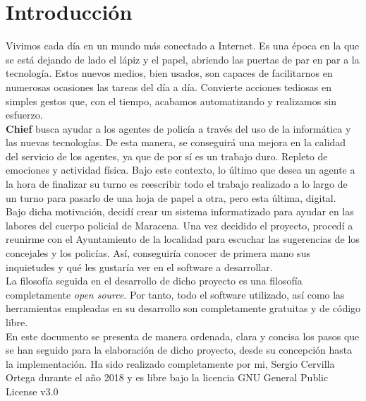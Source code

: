 \chapter{Introducción}

Vivimos cada día en un mundo más conectado a Internet. Es una época en la que se está dejando de 
lado el lápiz y el papel, abriendo las puertas de par en par a la tecnología. Estos nuevos medios, bien
usados, son capaces de facilitarnos en numerosas ocasiones las tareas del día a día. Convierte acciones
tediosas en simples gestos que, con el tiempo, acabamos automatizando y realizamos sin esfuerzo.\\ 

\textbf{Chief} busca ayudar a los agentes de policía a través del uso de la informática y las nuevas tecnologías. De esta manera, se conseguirá una mejora en la calidad del servicio de los agentes, ya que de por sí es un 
trabajo duro. Repleto de emociones y actividad física. Bajo este contexto, lo último que desea un
agente a la hora de finalizar su turno es reescribir todo el trabajo realizado a lo largo de un 
turno para pasarlo de una hoja de papel a otra, pero esta última, digital.\\ 

Bajo dicha motivación, decidí crear un sistema informatizado para ayudar en las labores del cuerpo 
policial de Maracena. Una vez decidido el proyecto, procedí a reunirme con el Ayuntamiento de la 
localidad para escuchar las sugerencias de los  concejales y los policías. Así, conseguiría conocer de 
primera mano  sus inquietudes y qué les gustaría ver en el software a desarrollar.\\

La filosofía seguida en el desarrollo de dicho proyecto es una filosofía completamente \textit{open source}.
Por tanto, todo el software utilizado, así como las herramientas empleadas en su desarrollo son completamente
gratuitas y de código libre.\\ 

En este documento se presenta de manera ordenada, clara y concisa los pasos que se han seguido para
la elaboración de dicho proyecto, desde su concepción hasta la implementación. Ha sido realizado completamente por mi, Sergio Cervilla Ortega durante 
el año 2018 y es libre bajo la licencia GNU General Public License v3.0 \cite{gplv3}\\ 


